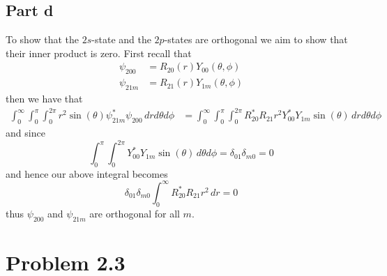 \documentclass[12pt]{report}
\begin{document}
\subsection*{Part d}
To show that the $2s$-state and the $2p$-states are orthogonal we aim to show that their inner product is zero. First recall that
\begin{align*}
  \psi_{200} &= R_{20}(r)Y_{00}(\theta,\phi) \\
  \psi_{21m} &= R_{21}(r)Y_{1m}(\theta,\phi)
\end{align*}
then we have that 
\begin{align*}
  \int_0^\infty \int_0^\pi \int_0^{2\pi} r^2 \sin(\theta) \psi_{21m}^* \psi_{200} \, dr d\theta d\phi &= \int_0^\infty \int_0^\pi \int_0^{2\pi} R_{20}^* R_{21} r^2 Y^*_{00}Y_{1m} \sin(\theta) \, dr d\theta d\phi \
\end{align*}
and since
\begin{equation*}
  \int_0^{\pi} \int_0^{2\pi} Y^*_{00}Y_{1m} \sin(\theta) \, d\theta d\phi = \delta_{01} \delta_{m0} = 0
\end{equation*}
and hence our above integral becomes
\begin{equation*}
  \delta_{01} \delta_{m0}\int_0^\infty R_{20}^* R_{21} r^2 \, dr = 0
\end{equation*}
thus $\psi_{200}$ and $\psi_{21m}$ are orthogonal for all $m$.

\section*{Problem 2.3}
\end{document}
